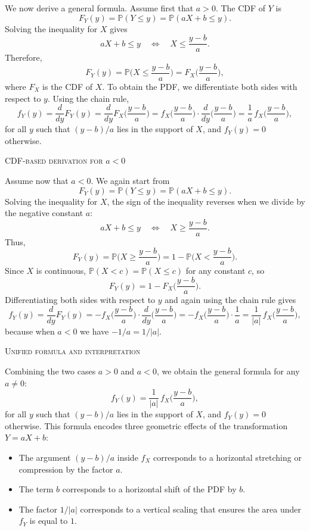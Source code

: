 We now derive a general formula.  
Assume first that \(a>0\).  
The CDF of \(Y\) is
\[
F_Y(y)
=
\mathbb{P}(Y \le y)
=
\mathbb{P}(aX + b \le y).
\]
Solving the inequality for \(X\) gives
\[
aX + b \le y
\quad\Longleftrightarrow\quad
X \le \frac{y - b}{a}.
\]
Therefore,
\[
F_Y(y)
=
\mathbb{P}\Big(X \le \frac{y - b}{a}\Big)
=
F_X\Big(\frac{y - b}{a}\Big),
\]
where \(F_X\) is the CDF of \(X\).  
To obtain the PDF, we differentiate both sides with respect to \(y\).  
Using the chain rule,
\[
f_Y(y)
=
\frac{d}{dy} F_Y(y)
=
\frac{d}{dy} F_X\Big(\frac{y - b}{a}\Big)
=
f_X\Big(\frac{y - b}{a}\Big)\cdot\frac{d}{dy}\Big(\frac{y - b}{a}\Big)
=
\frac{1}{a}\,f_X\Big(\frac{y - b}{a}\Big),
\]
for all \(y\) such that \((y-b)/a\) lies in the support of \(X\), and \(f_Y(y)=0\) otherwise.

\textsc{CDF-based derivation for \(a<0\)}

Assume now that \(a<0\).  
We again start from
\[
F_Y(y)
=
\mathbb{P}(Y \le y)
=
\mathbb{P}(aX + b \le y).
\]
Solving the inequality for \(X\), the sign of the inequality reverses when we divide by the negative constant \(a\):
\[
aX + b \le y
\quad\Longleftrightarrow\quad
X \ge \frac{y - b}{a}.
\]
Thus,
\[
F_Y(y)
=
\mathbb{P}\Big(X \ge \frac{y - b}{a}\Big)
=
1 - \mathbb{P}\Big(X < \frac{y - b}{a}\Big).
\]
Since \(X\) is continuous, \(\mathbb{P}(X < c) = \mathbb{P}(X \le c)\) for any constant \(c\), so
\[
F_Y(y)
=
1 - F_X\Big(\frac{y - b}{a}\Big).
\]
Differentiating both sides with respect to \(y\) and again using the chain rule gives
\[
f_Y(y)
=
\frac{d}{dy} F_Y(y)
=
- f_X\Big(\frac{y - b}{a}\Big)\cdot\frac{d}{dy}\Big(\frac{y - b}{a}\Big)
=
- f_X\Big(\frac{y - b}{a}\Big)\cdot\frac{1}{a}
=
\frac{1}{|a|}\,f_X\Big(\frac{y - b}{a}\Big),
\]
because when \(a<0\) we have \(-1/a = 1/|a|\).

\textsc{Unified formula and interpretation}

Combining the two cases \(a>0\) and \(a<0\), we obtain the general formula for any \(a\neq 0\):
\[
f_Y(y)
=
\frac{1}{|a|}\,
f_X\Big(\frac{y - b}{a}\Big),
\]
for all \(y\) such that \((y-b)/a\) lies in the support of \(X\), and \(f_Y(y)=0\) otherwise.  
This formula encodes three geometric effects of the transformation \(Y = aX + b\):
\begin{itemize}
\item The argument \((y-b)/a\) inside \(f_X\) corresponds to a horizontal stretching or compression by the factor \(a\).  
\item The term \(b\) corresponds to a horizontal shift of the PDF by \(b\).  
\item The factor \(1/|a|\) corresponds to a vertical scaling that ensures the area under \(f_Y\) is equal to \(1\).  
\end{itemize}


